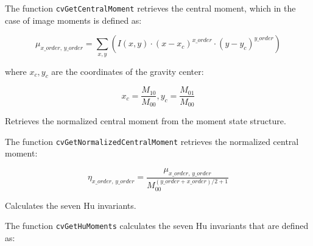 The function \texttt{cvGetCentralMoment} retrieves the central moment, which in the case of image moments is defined as:

\[
\mu_{x\_order, \, y\_order} = \sum_{x,y} (I(x,y) \cdot (x-x_c)^{x\_order} \cdot (y-y_c)^{y\_order})
\]

where $x_c,y_c$ are the coordinates of the gravity center:

\[
x_c=\frac{M_{10}}{M_{00}}, y_c=\frac{M_{01}}{M_{00}}
\]

\label{GetNormalizedCentralMoment}

Retrieves the normalized central moment from the moment state structure.


\begin{description}
\end{description}

The function \texttt{cvGetNormalizedCentralMoment} retrieves the normalized central moment:

\[
\eta_{x\_order, \, y\_order} = \frac{\mu_{x\_order, \, y\_order}}{M_{00}^{(y\_order+x\_order)/2+1}}
\]

\label{GetHuMoments}

Calculates the seven Hu invariants.


\begin{description}
\end{description}

The function \texttt{cvGetHuMoments} calculates the seven Hu invariants that are defined as:


